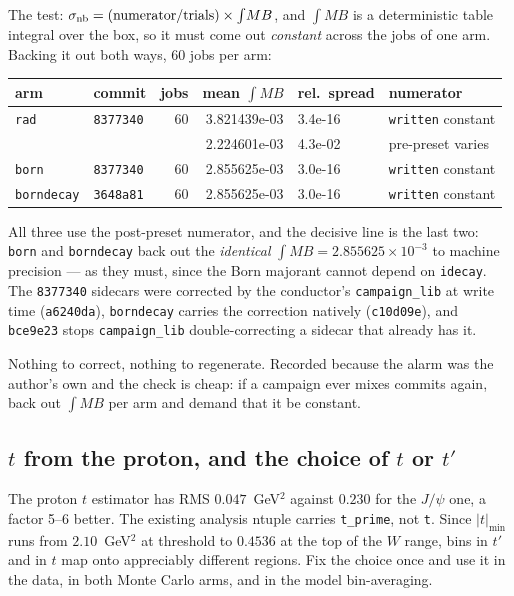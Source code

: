 \documentclass[11pt]{article}
\begin{document}
The test: $\sigma_{\rm nb}=(\text{numerator}/\text{trials})\times\int\!MB$, and $\int\!MB$ is a
deterministic table integral over the box, so it must come out \emph{constant} across the jobs of one
arm. Backing it out both ways, 60 jobs per arm:

\begin{center}\small
\begin{tabular}{llrrll}
\toprule
arm & commit & jobs & mean $\int\!MB$ & rel.\ spread & numerator \\
\midrule
\texttt{rad} & \texttt{8377340} & 60 & 3.821439e-03 & 3.4e-16 & \texttt{written} \quad constant \\
 & & & 2.224601e-03 & 4.3e-02 & pre-preset \quad varies \\
\texttt{born} & \texttt{8377340} & 60 & 2.855625e-03 & 3.0e-16 & \texttt{written} \quad constant \\
\texttt{borndecay} & \texttt{3648a81} & 60 & 2.855625e-03 & 3.0e-16 & \texttt{written} \quad constant \\
\bottomrule
\end{tabular}
\end{center}

All three use the post-preset numerator, and the decisive line is the last two: \texttt{born} and
\texttt{borndecay} back out the \emph{identical} $\int\!MB=2.855625\times10^{-3}$ to machine
precision --- as they must, since the Born majorant cannot depend on \texttt{idecay}. The
\texttt{8377340} sidecars were corrected by the conductor's \texttt{campaign\_lib} at write time
(\texttt{a6240da}), \texttt{borndecay} carries the correction natively (\texttt{c10d09e}), and
\texttt{bce9e23} stops \texttt{campaign\_lib} double-correcting a sidecar that already has it.

Nothing to correct, nothing to regenerate. Recorded because the alarm was the author's own and the
check is cheap: if a campaign ever mixes commits again, back out $\int\!MB$ per arm and demand that
it be constant.

\subsection{$t$ from the proton, and the choice of $t$ or $t'$}

The proton $t$ estimator has RMS $0.047$~GeV$^2$ against $0.230$ for the $J/\psi$ one, a factor
5--6 better. The existing analysis ntuple carries \texttt{t\_prime}, not \texttt{t}. Since
$|t|_{\min}$ runs from $2.10$~GeV$^2$ at threshold to $0.4536$ at the top of the $W$ range, bins in
$t'$ and in $t$ map onto appreciably different regions. Fix the choice once and use it in the data,
in both Monte Carlo arms, and in the model bin-averaging.
\end{document}
